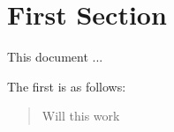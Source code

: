 \documentclass[a4paper,10pt]{article}
\begin{document}
 
\tableofcontents
 
\section{First Section}
This document ...

The first is as follows:
\begin{quote}
\cite{Scrum} Will this work
\end{quote}

\nocite{*} 
% 


 
\end{document}
